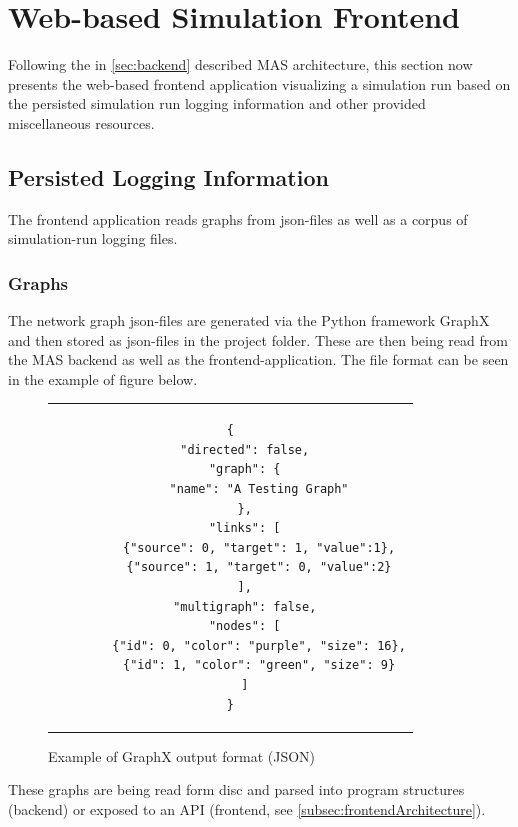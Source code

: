 \section{Web-based Simulation Frontend}\label{sec:frontend}

Following the in \autoref{sec:backend} described MAS architecture, this section now presents the web-based frontend application visualizing a simulation run based on the persisted simulation run logging information and other provided miscellaneous resources. 


\subsection{Persisted Logging Information}

The frontend application reads graphs from json-files as well as a corpus of simulation-run logging files.

\subsubsection{Graphs}\label{subsubsec:graphs}

The network graph json-files are generated via the Python framework GraphX and then stored as json-files in the project folder. These are then being read from the MAS backend as well as the frontend-application. The file format can be seen in the example of figure below.

\begin{figure}[thp]
    \centering
    \lstset{language=json, frame=single, linewidth=11cm}
    \begin{tabular}{c}
        \begin{lstlisting}
{
    "directed": false,
    "graph": {
        "name": "A Testing Graph"
    },
    "links": [
        {"source": 0, "target": 1, "value":1},
        {"source": 1, "target": 0, "value":2}
    ],
    "multigraph": false,
    "nodes": [
        {"id": 0, "color": "purple", "size": 16},
        {"id": 1, "color": "green", "size": 9}
    ]
}
        \end{lstlisting}
    \end{tabular}
    \caption{Example of GraphX output format (JSON)}
    \label{fig:graphx}
\end{figure}

These graphs are being read form disc and parsed into program structures (backend) or exposed to an API (frontend, see \autoref{subsec:frontendArchitecture}).

